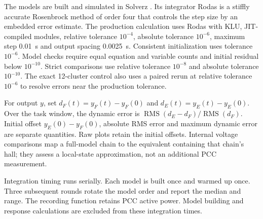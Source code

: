 The models are built and simulated in Solverz \cite{yu2026efficient}.
Its integrator Rodas is a stiffly accurate Rosenbrock method of order four that controls the step size by an embedded error estimate.
The production calculation uses Rodas with KLU, JIT-compiled modules, relative tolerance $10^{-4}$, absolute tolerance $10^{-6}$, maximum step 0.01~s and output spacing 0.0025~s.
Consistent initialization uses tolerance $10^{-6}$.
Model checks require equal equation and variable counts and initial residual below $10^{-10}$.
Strict comparisons use relative tolerance $10^{-8}$ and absolute tolerance $10^{-10}$.
The exact 12-cluster control also uses a paired rerun at relative tolerance $10^{-6}$ to resolve errors near the production tolerance.

For output $y$, set $d_F(t)=y_F(t)-y_F(0)$ and $d_E(t)=y_E(t)-y_E(0)$.
Over the task window, the dynamic error is $\operatorname{RMS}(d_E-d_F)/\operatorname{RMS}(d_F)$.
Initial offset $y_E(0)-y_F(0)$, absolute RMS error and maximum dynamic error are separate quantities.
Raw plots retain the initial offsets.
Internal voltage comparisons map a full-model chain to the equivalent containing that chain's hall; they assess a local-state approximation, not an additional PCC measurement.

Integration timing runs serially.
Each model is built once and warmed up once.
Three subsequent rounds rotate the model order and report the median and range.
The recording function retains PCC active power.
Model building and response calculations are excluded from these integration times.
